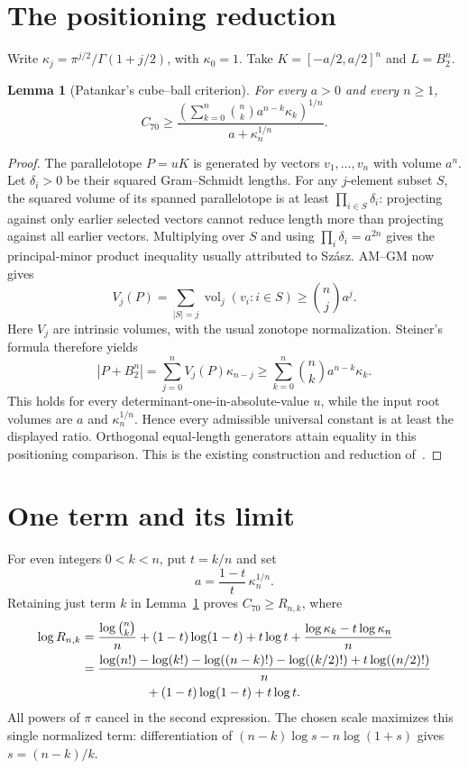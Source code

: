 \documentclass[11pt]{amsart}
\newtheorem{lemma}[theorem]{Lemma}
\begin{document}
\section{The positioning reduction}
Write $\kappa_j=\pi^{j/2}/\Gamma(1+j/2)$, with $\kappa_0=1$.
Take $K=[-a/2,a/2]^n$ and $L=B_2^n$.
\begin{lemma}[Patankar's cube--ball criterion]\label{criterion}
For every $a>0$ and every $n\ge1$,
\[
 C_{70}\ge
 \frac{\left(\sum_{k=0}^n\binom nk a^{n-k}\kappa_k\right)^{1/n}}
 {a+\kappa_n^{1/n}}.
\]
\end{lemma}
\begin{proof}
The parallelotope $P=uK$ is generated by vectors $v_1,\ldots,v_n$ with
volume $a^n$. Let $\delta_i>0$ be their squared Gram--Schmidt lengths.
For any $j$-element subset $S$, the squared volume of its spanned
parallelotope is at least $\prod_{i\in S}\delta_i$: projecting against
only earlier selected vectors cannot reduce length more than projecting
against all earlier vectors. Multiplying over $S$ and using
$\prod_i\delta_i=a^{2n}$ gives the principal-minor product inequality
usually attributed to Sz\'asz. AM--GM now gives
\[
 V_j(P)=\sum_{|S|=j}\operatorname{vol}_j(v_i:i\in S)
 \ge\binom nj a^j.
\]
Here $V_j$ are intrinsic volumes, with the usual zonotope normalization.
Steiner's formula therefore yields
\[
 |P+B_2^n|=\sum_{j=0}^n V_j(P)\kappa_{n-j}
 \ge\sum_{k=0}^n\binom nk a^{n-k}\kappa_k.
\]
This holds for every determinant-one-in-absolute-value $u$, while the
input root volumes are $a$ and $\kappa_n^{1/n}$. Hence every admissible
universal constant is at least the displayed ratio. Orthogonal equal-length
generators attain equality in this positioning comparison. This is the
existing construction and reduction of~\cite{patankar}.
\end{proof}

\section{One term and its limit}
For even integers $0<k<n$, put $t=k/n$ and set
\[
 a=\frac{1-t}{t}\,\kappa_n^{1/n}.
\]
Retaining just term $k$ in Lemma~\ref{criterion} proves $C_{70}\ge R_{n,k}$,
where
\begin{align}
 \log R_{n,k}
 &=\frac{\log\binom nk}{n}+(1-t)\log(1-t)+t\log t
     +\frac{\log\kappa_k-t\log\kappa_n}{n}\label{ratio}\\
 &=\frac{\log(n!)-\log(k!)-\log((n-k)!)
       -\log((k/2)!)+t\log((n/2)!)}{n}\notag\\
 &\hspace{18mm}+(1-t)\log(1-t)+t\log t.\label{factorial}
\end{align}
All powers of $\pi$ cancel in the second expression.
The chosen scale maximizes this single normalized term: differentiation
of $(n-k)\log s-n\log(1+s)$ gives $s=(n-k)/k$.
\end{document}
